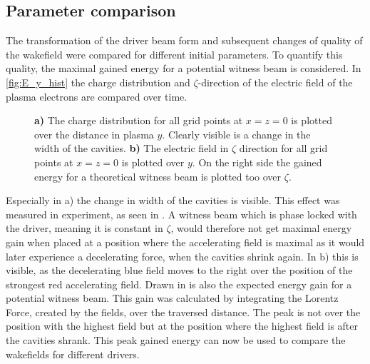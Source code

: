 \documentclass[bachelor_thesis]{subfiles}
\begin{document}
\subsection{Parameter comparison}
The transformation of the driver beam form and subsequent changes of quality of the wakefield were compared for different initial parameters. To quantify this quality, the maximal gained energy 
for a potential witness beam is considered. In \autoref{fig:E_y_hist} the charge distribution and $\zeta$-direction of the electric field of the plasma electrons are compared over time. 
\begin{figure}
	\centering
	
	\caption{
	\textbf{a)} The charge distribution for all grid points at $x=z=0$ is plotted over the distance in plasma $y$. Clearly visible is a change in the width of the cavities.
	\textbf{b)} The electric field in $\zeta$ direction for all grid points at $x=z=0$ is plotted over $y$. On the right side the gained energy for a theoretical
	witness beam is plotted too over $\zeta$.}
	\label{fig:E_y_hist}
\end{figure}
Especially in a) the change in width of the cavities is visible. This effect was measured in experiment, as seen in \cite{Schoebel2022}. A witness beam which is phase locked with the driver, meaning it is constant in $\zeta$,
would therefore not get maximal energy gain when placed at a position where the accelerating field is maximal as it would later experience a decelerating force, when the cavities shrink again.
In b) this is visible, as the decelerating blue field moves to the right over the position of the strongest red accelerating field. Drawn in is also the expected energy gain for a potential witness beam.
This gain was calculated by integrating the Lorentz Force, created by the fields, over the traversed distance. The peak is not over the position with the highest field but at the position where the highest field is after the cavities shrank.
This peak gained energy can now be used to compare the wakefields for different drivers.
\end{document}
